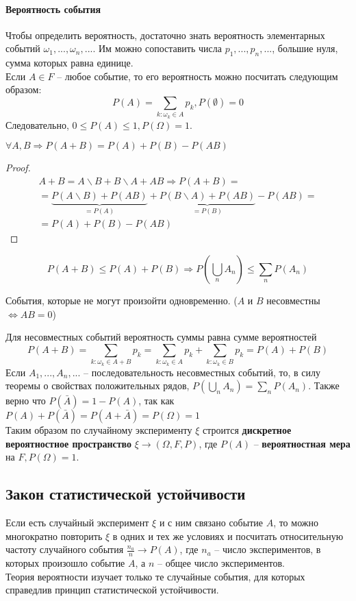 \paragraph{Вероятность события} Чтобы определить вероятность, достаточно знать вероятность элементарных событий $\omega_1,...,\omega_n,...$. Им можно сопоставить числа $p_1,...,p_n,...$, большие нуля, сумма которых равна единице.\\
Если $A\in F$ -- любое событие, то его вероятность можно посчитать следующим образом:
$$P(A)=\sum\limits_{k:\omega_k \in A} p_k, P(\emptyset)=0$$
Следовательно, $0\leqslant P(A)\leqslant 1, P(\Omega)=1$.
\begin{proposition}
$\forall A,B \Rightarrow P(A+B) = P(A)+P(B)-P(AB)$
\end{proposition}
\begin{proof}
\begin{multline*}
A+B=A\backslash B+B\backslash A+AB\Rightarrow P(A+B)=\\=\underbrace{P(A\backslash B)+P(AB)}_{=P(A)}+\underbrace{P(B\backslash A)+P(AB)}_{=P(B)}-P(AB)=\\=P(A)+P(B)-P(AB)
\end{multline*}
\end{proof}
$$P(A+B)\leqslant P(A)+P(B)\Rightarrow P\left(\bigcup\limits_n A_n\right)\leqslant\sum\limits_n P(A_n)$$
\begin{definition}
События, которые не могут произойти одновременно. ($A$ и $B$ несовместны $\Leftrightarrow AB = 0$)
\end{definition}
Для несовместных событий вероятность суммы равна сумме вероятностей
$$P(A+B)=\sum\limits_{k:\omega_k \in A+B} p_k = \sum\limits_{k:\omega_k \in A} p_k+\sum\limits_{k:\omega_k \in B} p_k = P(A)+P(B)$$
Если $A_1,...,A_n,...$ -- последовательность несовместных событий, то, в силу теоремы о свойствах положительных рядов, $P\left(\bigcup\limits_n A_n\right)=\sum\limits_n P(A_n)$. Также верно что $P(\bar{A})=1-P(A)$, так как  $P(A)+P(\bar{A})=P(A+\bar{A})=P(\Omega)=1$\\
Таким образом по случайному эксперименту $\xi$ строится \textbf{дискретное вероятностное пространство} $\xi\rightarrow(\Omega,F,P)$, где $P(A)$ -- \textbf{вероятностная мера} на $F, P(\Omega)=1$.
\subsection{Закон статистической устойчивости}
Если есть случайный эксперимент $\xi$ и с ним связано событие $A$, то можно многократно повторить $\xi$ в одних и тех же условиях и посчитать относительную частоту случайного события $\frac{n_a}{n}\rightarrow P(A)$, где $n_a$ -- число экспериментов, в которых произошло событие $A$, а $n$ -- общее число экспериментов.\\
Теория вероятности изучает только те случайные события, для которых справедлив принцип статистической устойчивости.
